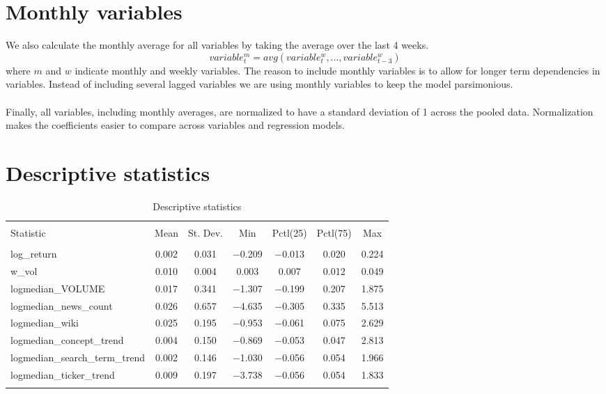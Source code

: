 \section{Monthly variables}
 We also calculate the monthly average for all variables by taking the average over the last 4 weeks. 
\begin{equation}
   \label{monthly_var} 
   variable^{m}_t = avg(variable^{w}_{t},...,variable^{w}_{t-3}) 
\end{equation}
where $m$ and $w$ indicate monthly and weekly variables. The reason to include monthly variables is to allow for longer term dependencies in variables. Instead of including several lagged variables we are using monthly variables to keep the model parsimonious.
\\\\
Finally, all variables, including monthly averages, are normalized to have a standard deviation of 1 across the pooled data. Normalization makes the coefficients easier to compare across variables and regression models.
\section{Descriptive statistics}
\begin{table}[!htbp] \centering 
  \caption{Descriptive statistics} 
  \label{tab:desc_stat} 
\begin{tabular}{@{\extracolsep{5pt}}lcccccc} 
\\[-1.8ex]\hline 
\hline \\[-1.8ex] 
Statistic & \multicolumn{1}{c}{Mean} & \multicolumn{1}{c}{St. Dev.} & \multicolumn{1}{c}{Min} & \multicolumn{1}{c}{Pctl(25)} & \multicolumn{1}{c}{Pctl(75)} & \multicolumn{1}{c}{Max} \\ 
\hline \\[-1.8ex] 
log\_return & 0.002 & 0.031 & $-$0.209 & $-$0.013 & 0.020 & 0.224 \\ 
w\_vol & 0.010 & 0.004 & 0.003 & 0.007 & 0.012 & 0.049 \\ 
logmedian\_VOLUME & 0.017 & 0.341 & $-$1.307 & $-$0.199 & 0.207 & 1.875 \\ 
logmedian\_news\_count & 0.026 & 0.657 & $-$4.635 & $-$0.305 & 0.335 & 5.513 \\ 
logmedian\_wiki & 0.025 & 0.195 & $-$0.953 & $-$0.061 & 0.075 & 2.629 \\ 
logmedian\_concept\_trend & 0.004 & 0.150 & $-$0.869 & $-$0.053 & 0.047 & 2.813 \\ 
logmedian\_search\_term\_trend & 0.002 & 0.146 & $-$1.030 & $-$0.056 & 0.054 & 1.966 \\ 
logmedian\_ticker\_trend & 0.009 & 0.197 & $-$3.738 & $-$0.056 & 0.054 & 1.833 \\ 
\hline \\[-1.8ex] 
\end{tabular} 
\end{table} 


